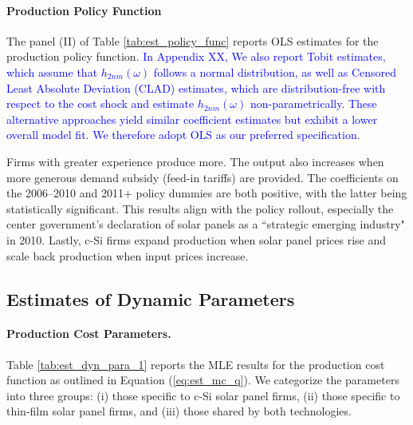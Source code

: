 \documentclass[12pt, letter]{article}
\begin{document}
\paragraph{Production Policy Function}
The panel (II) of Table \ref{tab:est_policy_func} reports OLS estimates for the production policy function. \textcolor{blue}{In Appendix XX, We also report Tobit estimates, which assume that $h_{2nm}(\omega)$ follows a normal distribution, as well as Censored Least Absolute Deviation (CLAD) estimates, which are distribution-free with respect to the cost shock and estimate $h_{2nm}(\omega)$ non-parametrically. These alternative approaches yield similar coefficient estimates but exhibit a lower overall model fit. We therefore adopt OLS as our preferred specification.} 

Firms with greater experience produce more. The output also increases when more generous demand subsidy (feed-in tariffs) are provided. The coefficients on the 2006–2010 and 2011+ policy dummies are both positive, with the latter being statistically significant. This results align with the policy rollout, especially the center government's declaration of solar panels as a ``strategic emerging industry" in 2010. Lastly, c-Si firms expand production when solar panel prices rise and scale back production when input prices increase.






\subsection{Estimates of Dynamic Parameters}
\label{subsec:est_results_dyn_para}

\paragraph{Production Cost Parameters.}
Table \ref{tab:est_dyn_para_1} reports the MLE results for the production cost function as outlined in Equation (\ref{eq:est_mc_q}). We categorize the parameters into three groups: (i) those specific to c-Si solar panel firms, (ii) those specific to thin-film solar panel firms, and (iii) those shared by both technologies. 
\end{document}
